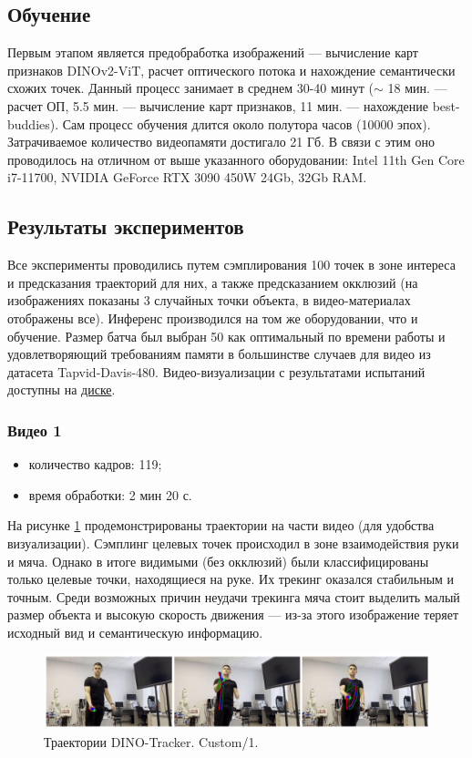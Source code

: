 \documentclass[a4paper, 14pt]{extarticle}
\theoremstyle{definition}
\theoremstyle{plain}
\theoremstyle{remark}
\begin{document}
\subsection{Обучение}

Первым этапом является предобработка изображений --- вычисление карт признаков DINOv2-ViT, расчет оптического потока и нахождение семантически схожих точек. Данный процесс занимает в среднем 30-40 минут ($\sim$ 18 мин. --- расчет ОП, 5.5 мин. --- вычисление карт признаков, 11 мин. --- нахождение best-buddies). Сам процесс обучения длится около полутора часов (10000 эпох).
Затрачиваемое количество видеопамяти достигало 21 Гб. В связи с этим оно проводилось на отличном от выше указанного оборудовании: Intel 11th Gen Core i7-11700, NVIDIA GeForce RTX 3090 450W 24Gb, 32Gb RAM.

\subsection{Результаты экспериментов}
Все эксперименты проводились путем сэмплирования 100 точек в зоне интереса и предсказания траекторий для них, а также предсказанием окклюзий (на изображениях показаны 3 случайных точки объекта, в видео-материалах отображены все). Инференс производился на том же оборудовании, что и обучение. Размер батча был выбран 50 как оптимальный по времени работы и удовлетворяющий требованиям памяти в большинстве случаев для видео из датасета Tapvid-Davis-480. Видео-визуализации с результатами испытаний доступны на \href{https://drive.google.com/drive/folders/1jyuXTmpgYpkRt16hLX30Lu-oDO__paxN?usp=drive_link}{диске}.

\subsubsection{Видео 1}
\begin{itemize}
	\item количество кадров: 119;
	\item время обработки: 2 мин 20 с.
\end{itemize}

На рисунке \ref{fig:custom-1} продемонстрированы траектории на части видео (для удобства визуализации). Сэмплинг целевых точек происходил в зоне взаимодействия руки и мяча. Однако в итоге видимыми (без окклюзий) были классифицированы только целевые точки, находящиеся на руке. Их трекинг оказался стабильным и точным. Среди возможных причин неудачи трекинга мяча стоит выделить малый размер объекта и высокую скорость движения --- из-за этого изображение теряет исходный вид и семантическую информацию. 
\begin{figure}
    [H]
    \centering
    \includegraphics[width=\textwidth]{figs/custom-1.png}
    \caption{Траектории DINO-Tracker. Custom/1.}
    \label{fig:custom-1}
\end{figure}
\end{document}
